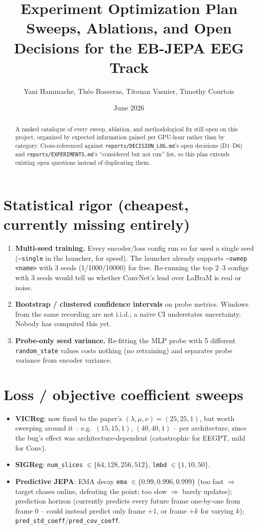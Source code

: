 \documentclass[10pt,a4paper]{article}
\title{\textbf{Experiment Optimization Plan}\\
  \large Sweeps, Ablations, and Open Decisions for the EB-JEPA EEG Track}
\author{Yani Hammache, Théo Basseras, Titouan Vasnier, Timothy Courtois}
\date{June 2026}
\begin{document}
\maketitle

\begin{abstract}
A ranked catalogue of every sweep, ablation, and methodological fix still open on
this project, organized by expected information gained per GPU-hour rather than by
category. Cross-referenced against \texttt{reports/DECISION\_LOG.md}'s open decisions
(D1--D6) and \texttt{reports/EXPERIMENTS.md}'s ``considered but not run'' list, so
this plan extends existing open questions instead of duplicating them.
\end{abstract}

\section{Statistical rigor (cheapest, currently missing entirely)}
\begin{enumerate}
  \item \textbf{Multi-seed training.} Every encoder/loss config run so far used a
  single seed (\texttt{--single} in the launcher, for speed). The launcher already
  supports \texttt{--sweep <name>} with 3 seeds (1/1000/10000) for free. Re-running the
  top 2--3 configs with 3 seeds would tell us whether ConvNet's lead over LaBraM is
  real or noise.
  \item \textbf{Bootstrap / clustered confidence intervals} on probe metrics. Windows
  from the same recording are not i.i.d.; a naive CI understates uncertainty. Nobody
  has computed this yet.
  \item \textbf{Probe-only seed variance.} Re-fitting the MLP probe with 5 different
  \texttt{random\_state} values costs nothing (no retraining) and separates probe
  variance from encoder variance.
\end{enumerate}

\section{Loss / objective coefficient sweeps}
\begin{itemize}
  \item \textbf{VICReg}: now fixed to the paper's $(\lambda,\mu,\nu)=(25,25,1)$, but
  worth sweeping around it -- e.g.\ $(15,15,1)$, $(40,40,1)$ -- per architecture,
  since the bug's effect was architecture-dependent (catastrophic for EEGPT, mild for
  Conv).
  \item \textbf{SIGReg}: \texttt{num\_slices} $\in \{64,128,256,512\}$,
  \texttt{lmbd} $\in \{1,10,50\}$.
  \item \textbf{Predictive JEPA}: EMA decay \texttt{ema} $\in \{0.99, 0.996, 0.999\}$
  (too fast $\Rightarrow$ target chases online, defeating the point; too slow
  $\Rightarrow$ barely updates); prediction horizon (currently predicts every future
  frame one-by-one from frame 0 -- could instead predict only frame $+1$, or frame
  $+k$ for varying $k$); \texttt{pred\_std\_coeff}/\texttt{pred\_cov\_coeff}.
\end{itemize}
\end{document}
